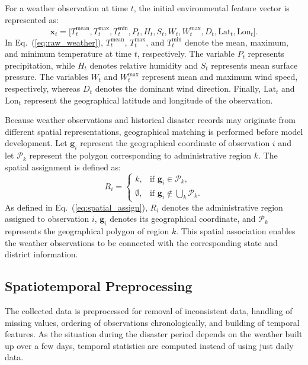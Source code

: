 \documentclass[conference]{IEEEtran}
\begin{document}
For a weather observation at time $t$, the initial environmental feature vector is represented as:
\begin{equation}
\mathbf{x}_t = \big[ T^{\text{mean}}_t, T^{\text{max}}_t, T^{\text{min}}_t, P_t, H_t, S_t, W_t, W^{\text{max}}_t, D_t, \text{Lat}_t, \text{Lon}_t \big].
\label{eq:raw_weather}
\end{equation}
In Eq.~(\ref{eq:raw_weather}), $T^{\text{mean}}_t$, $T^{\text{max}}_t$, and $T^{\text{min}}_t$ denote the mean, maximum, and minimum temperature at time $t$, respectively. The variable $P_t$ represents precipitation, while $H_t$ denotes relative humidity and $S_t$ represents mean surface pressure. The variables $W_t$ and $W^{\text{max}}_t$ represent mean and maximum wind speed, respectively, whereas $D_t$ denotes the dominant wind direction. Finally, $\text{Lat}_t$ and $\text{Lon}_t$ represent the geographical latitude and longitude of the observation.

Because weather observations and historical disaster records may originate from different spatial representations, geographical matching is performed before model development. Let $\mathbf{g}_i$ represent the geographical coordinate of observation $i$ and let $\mathcal{P}_k$ represent the polygon corresponding to administrative region $k$. The spatial assignment is defined as:
\begin{equation}
R_i = \begin{cases}
k, & \text{if } \mathbf{g}_i \in \mathcal{P}_k, \\
\emptyset, & \text{if } \mathbf{g}_i \notin \bigcup_k \mathcal{P}_k.
\end{cases}
\label{eq:spatial_assign}
\end{equation}
As defined in Eq.~(\ref{eq:spatial_assign}), $R_i$ denotes the administrative region assigned to observation $i$, $\mathbf{g}_i$ denotes its geographical coordinate, and $\mathcal{P}_k$ represents the geographical polygon of region $k$. This spatial association enables the weather observations to be connected with the corresponding state and district information.

\subsection{Spatiotemporal Preprocessing}
The collected data is preprocessed for removal of inconsistent data, handling of missing values, ordering of observations chronologically, and building of temporal features. As the situation during the disaster period depends on the weather built up over a few days, temporal statistics are computed instead of using just daily data.
\end{document}
